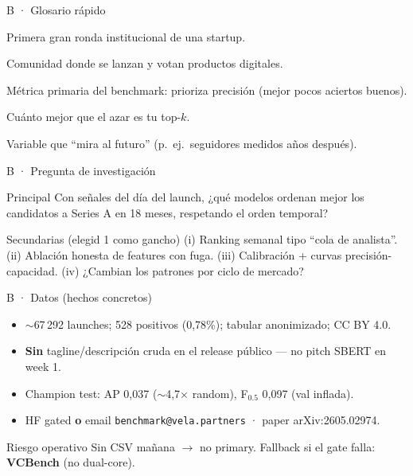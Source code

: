 \documentclass[aspectratio=169,10pt]{beamer}
\begin{document}
\begin{frame}{B · Glosario rápido}
  \begin{description}[font=\bfseries\scriptsize,style=nextline,leftmargin=1.5cm]
    \item[Series A] Primera gran ronda institucional de una startup.
    \item[Product Hunt] Comunidad donde se lanzan y votan productos digitales.
    \item[F0.5] Métrica primaria del benchmark: prioriza precisión (mejor pocos aciertos buenos).
    \item[Lift@k] Cuánto mejor que el azar es tu top-$k$.
    \item[Fuga] Variable que ``mira al futuro'' (p.\ ej.\ seguidores medidos años después).
  \end{description}
\end{frame}

\begin{frame}{B · Pregunta de investigación}
  \begin{block}{Principal}
    Con señales del día del launch, ¿qué modelos ordenan mejor los candidatos a Series A en 18 meses, respetando el orden temporal?
  \end{block}
  \begin{block}{Secundarias (elegid 1 como gancho)}
    \scriptsize
    (i) Ranking semanal tipo ``cola de analista''. \quad
    (ii) Ablación honesta de features con fuga. \quad
    (iii) Calibración + curvas precisión-capacidad. \quad
    (iv) ¿Cambian los patrones por ciclo de mercado?
  \end{block}
\end{frame}

\begin{frame}{B · Datos (hechos concretos)}
  \begin{itemize}
    \item $\sim$67\,292 launches; 528 positivos (0{,}78\%); tabular anonimizado; CC BY 4.0.
    \item \textbf{Sin} tagline/descripción cruda en el release público --- no pitch SBERT en week 1.
    \item Champion test: AP 0{,}037 ($\sim$4{,}7$\times$ random), F$_{0.5}$ 0{,}097 (val inflada).
    \item HF gated \textbf{o} email \texttt{benchmark@vela.partners} · paper arXiv:2605.02974.
  \end{itemize}
  \begin{block}{Riesgo operativo}
    Sin CSV mañana $\rightarrow$ no primary. Fallback si el gate falla: \textbf{VCBench} (no dual-core).
  \end{block}
\end{frame}
\end{document}
